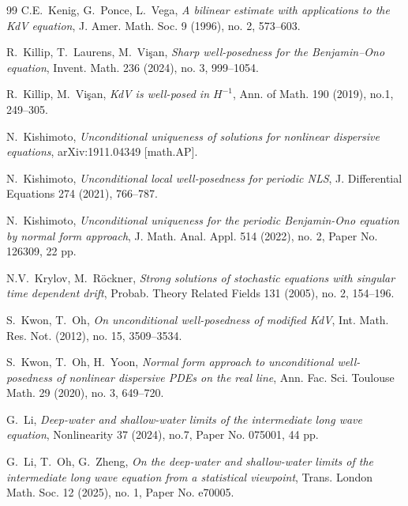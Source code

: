 \documentclass[letterpaper, 11pt,  reqno]{amsart}
\newcommand{\1}{\hspace{0.5mm}\text{I}\hspace{0.5mm}}
\numberwithin{equation}{section}
\numberwithin{theorem}{section}
\begin{document}
\begin{thebibliography}{99}
C.E.~Kenig, G.~Ponce, L.~Vega,
{\it A bilinear estimate with applications to the KdV equation},
J. Amer. Math. Soc. 9 (1996), no. 2, 573--603.






R.~Killip, T.~Laurens, M.~Vi\c{s}an, 
{\it Sharp well-posedness for the Benjamin--Ono equation}, 
Invent. Math. 236 (2024), no. 3, 999--1054.





R.~Killip, M.~Vi\c{s}an, 
{\it KdV is well-posed in $H^{-1}$}, 
Ann. of Math. 190 (2019), no.1, 249--305.



N.~Kishimoto,
{\it Unconditional uniqueness of solutions for nonlinear dispersive equations}, 
arXiv:1911.04349 [math.AP].



N.~Kishimoto, \emph{Unconditional local well-posedness for periodic NLS}, 
 J. Differential Equations 274 (2021), 766--787. 


N.~Kishimoto,
{\it Unconditional uniqueness for the periodic Benjamin-Ono equation by normal form approach},
 J. Math. Anal. Appl. 514 (2022), no. 2, Paper No. 126309, 22 pp.


N.V.~Krylov, M.~R\"ockner,
    {\it Strong solutions of stochastic equations with singular time dependent drift},
    Probab. Theory Related Fields 131 (2005), no. 2, 154--196. 





S.~Kwon, T.~Oh, 
{\it  On unconditional well-posedness of modified KdV}, Int. Math. Res. Not. (2012), no. 15, 3509--3534. 






S.~Kwon, T.~Oh, H.~Yoon, 
{\it Normal form approach to unconditional well-posedness of nonlinear dispersive PDEs on the real line}, Ann. Fac. Sci. Toulouse Math. 29 (2020), no. 3, 649--720. 



G.~Li, 
{\it Deep-water and shallow-water limits of the intermediate long wave equation}, 
 Nonlinearity 37 (2024), no.7, Paper No. 075001, 44 pp. 
 
 
G.~Li, T.~Oh, G.~Zheng,
{\it On the deep-water and shallow-water limits of the intermediate long wave equation from a statistical viewpoint}, 
Trans. London Math. Soc. 
 12 (2025), no. 1, Paper No. e70005. 







\end{thebibliography}
\end{document}
